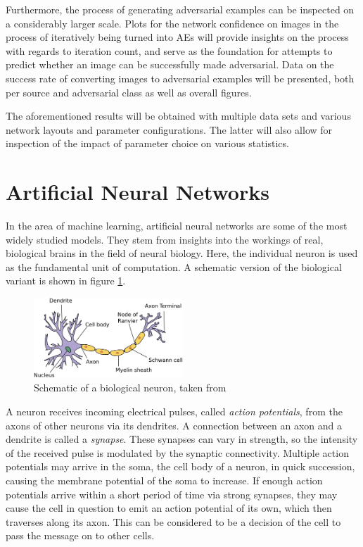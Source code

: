 \documentclass[11pt, a4paper]{article}
\begin{document}
Furthermore, the process of generating adversarial examples can be inspected on a considerably larger scale. Plots for the network confidence on images in the process of iteratively being turned into AEs will provide insights on the process with regards to iteration count, and serve as the foundation for attempts to predict whether an image can be successfully made adversarial. Data on the success rate of converting images to adversarial examples will be presented, both per source and adversarial class as well as overall figures.

The aforementioned results will be obtained with multiple data sets and various network layouts and parameter configurations. The latter will also allow for inspection of the impact of parameter choice on various statistics.











\newpage
\section{Artificial Neural Networks}
\label{sec:artificial-neural-networks}
In the area of machine learning, artificial neural networks are some of the most widely studied models. They stem from insights into the workings of real, biological brains in the field of neural biology. Here, the individual neuron is used as the fundamental unit of computation. A schematic version of the biological variant is shown in figure \ref{fig:biological-neuron-schematic}.

\begin{figure}[h!tb]
	\centering
	\includegraphics[width=0.5\textwidth]{images/biological_neuron.png}
	\caption[Biological neuron]{Schematic of a biological neuron, taken from \cite{biological-neuron-schematic}}
	\label{fig:biological-neuron-schematic}
\end{figure}

A neuron receives incoming electrical pulses, called \emph{action potentials}, from the axons of other neurons via its dendrites. A connection between an axon and a dendrite is called a \emph{synapse}. These synapses can vary in strength, so the intensity of the received pulse is modulated by the synaptic connectivity. Multiple action potentials may arrive in the soma, the cell body of a neuron, in quick succession, causing the membrane potential of the soma to increase. If enough action potentials arrive within a short period of time via strong synapses, they may cause the cell in question to emit an action potential of its own, which then traverses along its axon. This can be considered to be a decision of the cell to pass the message on to other cells.
\end{document}
